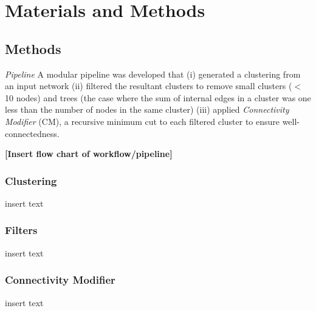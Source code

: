 \documentclass[12pt, oneside]{article}   	%
\begin{document}
\section{Materials and Methods}

\subsection{Methods} 
\emph{Pipeline} A modular pipeline was developed that (i) generated a clustering from an input network (ii) filtered the resultant clusters to remove small clusters ($<$ 10 nodes) and trees (the case where the sum of internal edges in a cluster was one less than the number of nodes in the same cluster) (iii) applied \emph{Connectivity Modifier} (CM), a recursive minimum cut to each filtered cluster to ensure well-connectedness.

\vspace{5 mm}
\textbf{[Insert flow chart of workflow/pipeline]}

\subsubsection{Clustering} insert text
\subsubsection{Filters} insert text
\subsubsection{Connectivity Modifier} insert text 
\end{document}
